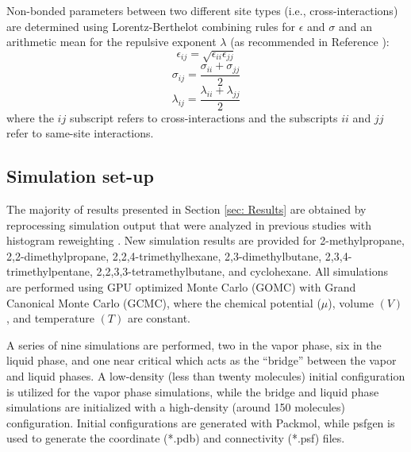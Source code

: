 \documentclass[journal=jced,manuscript=article]{achemso}
\begin{document}
    Non-bonded parameters between two different site types (i.e., cross-interactions) are determined using Lorentz-Berthelot combining rules \cite{Allen1987} for $\epsilon$ and $\sigma$ and an arithmetic mean for the repulsive exponent $\lambda$ (as recommended in Reference ):
    \begin{equation} \label{eq:Lorentz-Berthelot_eps}
    \epsilon_{ij} = \sqrt{\epsilon_{ii} \epsilon_{jj}}
    \end{equation}
    \begin{equation} \label{eq:Lorentz-Berthelot_sig}
    \sigma_{ij} = \frac{\sigma_{ii} + \sigma_{jj}}{2}
    \end{equation}
    \begin{equation} \label{eq:Lorentz-Berthelot_lam}
    \lambda_{ij} = \frac{\lambda_{ii} + \lambda_{jj}}{2}
    \end{equation}
    where the $ij$ subscript refers to cross-interactions and the subscripts $ii$ and $jj$ refer to same-site interactions. 
    

\subsection{Simulation set-up} \label{sec: Simulation set-up}

The majority of results presented in Section \ref{sec: Results} are obtained by reprocessing simulation output that were analyzed in previous studies with histogram reweighting \cite{Potoff_branched,Barhaghi2017}. New simulation results are provided for 2-methylpropane, 2,2-dimethylpropane, 2,2,4-trimethylhexane, 2,3-dimethylbutane, 2,3,4-trimethylpentane, 2,2,3,3-tetramethylbutane, and cyclohexane. All simulations are performed using GPU optimized Monte Carlo (GOMC) \cite{GOMC} with Grand Canonical Monte Carlo (GCMC), where the chemical potential ($\mu$), volume $(V)$, and temperature $(T)$ are constant. 

A series of nine simulations are performed, two in the vapor phase, six in the liquid phase, and one near critical which acts as the ``bridge'' between the vapor and liquid phases. A low-density (less than twenty molecules) initial configuration is utilized for the vapor phase simulations, while the bridge and liquid phase simulations are initialized with a high-density (around 150 molecules) configuration. Initial configurations are generated with Packmol, while psfgen is used to generate the coordinate (*.pdb) and connectivity (*.psf) files.
\end{document}
